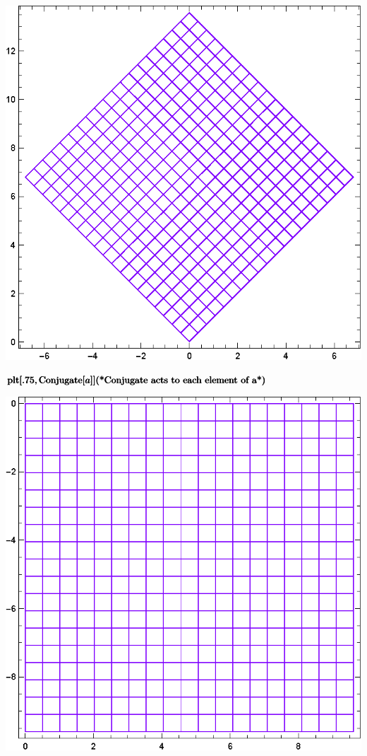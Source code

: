 \documentclass{article}
\begin{document}
\includegraphics{functions_on_complex-plane_gr2.eps}

\begin{doublespace}
\noindent\(\pmb{\text{plt}[.75,\text{Conjugate}[a]]}\\
\pmb{\text{(*Conjugate acts to each element of a*)}}\)
\end{doublespace}

\includegraphics{functions_on_complex-plane_gr3.eps}
\end{document}
